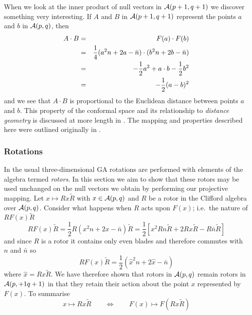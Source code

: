 When we look at the inner product of null vectors in
${\mathcal{A}}(p+1,q+1)$ we discover something very
interesting. If $A$ and $B$ in ${\mathcal{A}}(p+1,q+1)$
represent the points $a$ and $b$ in ${\mathcal{A}}(p,q)$, then
%
\begin{eqnarray} A\cdot B &  =  &  F(a)\cdot F(b) \nonumber \\
            &  =  &  \frac{1}{4}(a^2n + 2a - \bar{n})\cdot (b^2n + 2b -
            \bar{n})\nonumber \\
            & = &    -\frac{1}{2}a^2 + a\cdot b - \frac{1}{2}b^2 \nonumber \\
            &  =  &  -\frac{1}{2}(a-b)^2
            \label{distance}
\end{eqnarray}
%
and we see that $A\cdot B$ is proportional to the Euclidean
distance between points $a$ and $b$. This property of the
conformal space and its relationship to \emph{distance geometry}
\cite{distgeom} is discussed at more length in \cite{oldwine}. 
The mapping and properties described here were outlined
originally in \cite{HS84}.

\subsubsection{Rotations}


In the usual three-dimensional GA rotations are performed with elements of the algebra termed
\emph{rotors}. In this section we aim to show that these rotors may be used
unchanged on the null vectors we obtain by performing our projective mapping.
Let $x \mapsto Rx\tilde{R}$ with $x\in {\mathcal{A}}(p,q)$ and $R$ be a
rotor in the Clifford algebra over ${\mathcal{A}}(p,q)$. Consider
what happens when $R$ acts upon $F(x)$; i.e.\ the nature of
$RF(x)\tilde{R}$
%
\[ RF(x)\tilde{R} =\frac{1}{2} R(x^2n + 2x - \bar{n})\tilde{R} =\frac{1}{2}[ x^2Rn\tilde{R}
+ 2Rx\tilde{R} - R\bar{n}\tilde{R}] \]
%
and since $R$ is a rotor it contains only even blades and therefore 
commutes with
$n$ and $\bar{n}$  
so
%
\begin{equation} RF(x)\tilde{R} = \frac{1}{2}(\hat{x}^2n + 2\hat{x} - \bar{n})
	\end{equation}
%
where $\hat{x}=R x \tilde{R}$. We have therefore shown that rotors in
${\mathcal{A}}(p,q)$ remain rotors in ${\mathcal{A}}(p,+1q+1)$ in that they retain
their action about the point $x$ represented by $F(x)$. To summarise
%
\begin{equation} x \mapsto Rx\tilde{R} \qquad \Leftrightarrow \qquad F(x) \mapsto
F(Rx\tilde{R}) \end{equation}
%

